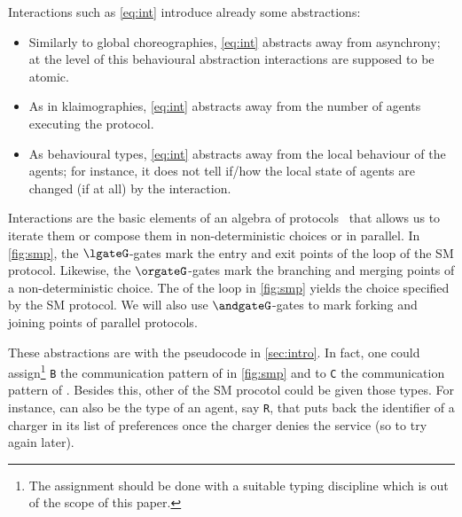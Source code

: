 Interactions such as \eqref{eq:int} introduce already some
abstractions:
\begin{itemize}
\item Similarly to global choreographies, \eqref{eq:int}
  abstracts away from asynchrony; at the level of this behavioural
  abstraction interactions are supposed to be atomic.
\item As in klaimographies, \eqref{eq:int} abstracts away
  from the number of agents executing the protocol.
\item As behavioural types,  \eqref{eq:int} abstracts away
  from the local behaviour of the agents; for instance,
  it does not tell if/how the local state of agents are
  changed (if at all) by the interaction.
\end{itemize}

Interactions are the basic elements of an algebra of
protocols~\cite{gt18} that allows us to iterate them or compose them
in non-deterministic choices or in parallel.
%
In \cref{fig:smp}, the $\lgateG$-gates mark the entry and exit points
of the loop of the SM protocol.
%
Likewise, the $\orgateG$-gates mark the branching and merging points
of a non-deterministic choice.
%
The  of the loop in \cref{fig:smp} yields the choice
specified by the SM protocol.
%
We will also use $\andgateG$-gates to mark forking and joining points
of parallel protocols.

These abstractions are  with the pseudocode in
\cref{sec:intro}.
%
In fact, one could assign\footnote{
  The assignment should be done with a suitable typing discipline
  which is out of the scope of this paper.
} \texttt{B} the communication
pattern of \p[m] in \cref{fig:smp} and to \texttt{C} the
communication pattern of \p[w].
%
Besides this, other  of the SM procotol could
be given those types.
%
For instance, \p[m] can also be the type of an agent, say
\texttt{R}, that puts back the identifier of a charger in
its list of preferences once the charger denies the service (so to try
again later).

